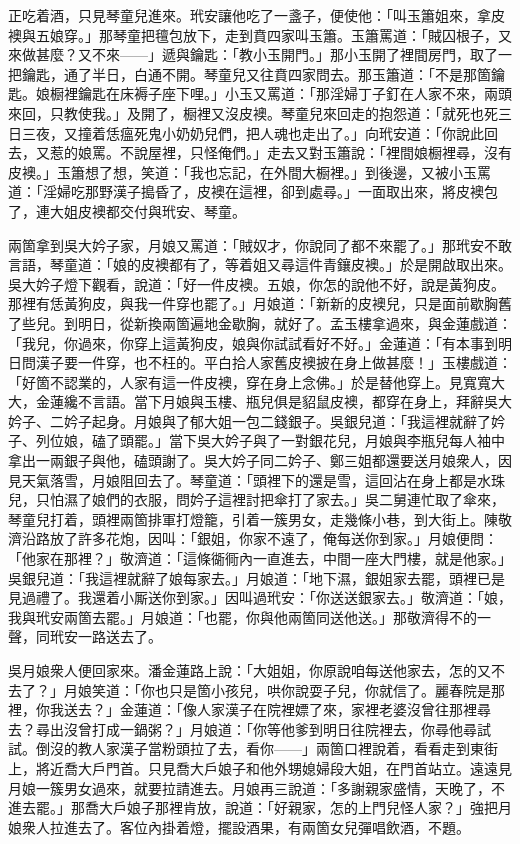 正吃着酒，只見琴童兒進來。玳安讓他吃了一盞子，便使他：「叫玉簫姐來，拿皮襖與五娘穿。」那琴童把氊包放下，走到賁四家叫玉簫。玉簫罵道：「賊囚根子，又來做甚麼？又不來——」遞與鑰匙：「教小玉開門。」那小玉開了裡間房門，取了一把鑰匙，通了半日，白通不開。琴童兒又往賁四家問去。那玉簫道：「不是那箇鑰匙。娘橱裡鑰匙在床褥子座下哩。」小玉又罵道：「那淫婦丁子釘在人家不來，兩頭來回，只教使我。」及開了，橱裡又沒皮襖。琴童兒來回走的抱怨道：「就死也死三日三夜，又撞着恁瘟死鬼小奶奶兒們，把人魂也走出了。」向玳安道：「你說此回去，又惹的娘罵。不說屋裡，只怪俺們。」走去又對玉簫說：「裡間娘橱裡尋，沒有皮襖。」玉簫想了想，笑道：「我也忘記，在外間大橱裡。」到後邊，又被小玉罵道：「淫婦吃那野漢子搗昏了，皮襖在這裡，卻到處尋。」一面取出來，將皮襖包了，連大姐皮襖都交付與玳安、琴童。

兩箇拿到吳大妗子家，月娘又罵道：「賊奴才，你說同了都不來罷了。」那玳安不敢言語，琴童道：「娘的皮襖都有了，等着姐又尋這件青鑲皮襖。」於是開啟取出來。吳大妗子燈下觀看，說道：「好一件皮襖。五娘，你怎的說他不好，說是黃狗皮。那裡有恁黃狗皮，與我一件穿也罷了。」月娘道：「新新的皮襖兒，只是面前歇胸舊了些兒。到明日，從新換兩箇遍地金歇胸，就好了。孟玉樓拿過來，與金蓮戲道：「我兒，你過來，你穿上這黃狗皮，娘與你試試看好不好。」金蓮道：「有本事到明日問漢子要一件穿，也不枉的。平白拾人家舊皮襖披在身上做甚麼！」玉樓戲道：「好箇不認業的，人家有這一件皮襖，穿在身上念佛。」於是替他穿上。見寬寬大大，金蓮纔不言語。當下月娘與玉樓、瓶兒俱是貂鼠皮襖，都穿在身上，拜辭吳大妗子、二妗子起身。月娘與了郁大姐一包二錢銀子。吳銀兒道：「我這裡就辭了妗子、列位娘，磕了頭罷。」當下吳大妗子與了一對銀花兒，月娘與李瓶兒每人袖中拿出一兩銀子與他，磕頭謝了。吳大妗子同二妗子、鄭三姐都還要送月娘衆人，因見天氣落雪，月娘阻回去了。琴童道：「頭裡下的還是雪，這回沾在身上都是水珠兒，只怕濕了娘們的衣服，問妗子這裡討把傘打了家去。」吳二舅連忙取了傘來，琴童兒打着，頭裡兩箇排軍打燈籠，引着一簇男女，走幾條小巷，到大街上。陳敬濟沿路放了許多花炮，因叫：「銀姐，你家不遠了，俺每送你到家。」月娘便問：「他家在那裡？」敬濟道：「這條衚衕內一直進去，中間一座大門樓，就是他家。」吳銀兒道：「我這裡就辭了娘每家去。」月娘道：「地下濕，銀姐家去罷，頭裡已是見過禮了。我還着小厮送你到家。」因叫過玳安：「你送送銀家去。」敬濟道：「娘，我與玳安兩箇去罷。」月娘道：「也罷，你與他兩箇同送他送。」那敬濟得不的一聲，同玳安一路送去了。

吳月娘衆人便回家來。潘金蓮路上說：「大姐姐，你原說咱每送他家去，怎的又不去了？」月娘笑道：「你也只是箇小孩兒，哄你說耍子兒，你就信了。麗春院是那裡，你我送去？」金蓮道：「像人家漢子在院裡嫖了來，家裡老婆沒曾往那裡尋去？尋出沒曾打成一鍋粥？」月娘道：「你等他爹到明日往院裡去，你尋他尋試試。倒沒的教人家漢子當粉頭拉了去，看你——」兩箇口裡說着，看看走到東街上，將近喬大戶門首。只見喬大戶娘子和他外甥媳婦段大姐，在門首站立。遠遠見月娘一簇男女過來，就要拉請進去。月娘再三說道：「多謝親家盛情，天晚了，不進去罷。」那喬大戶娘子那裡肯放，說道：「好親家，怎的上門兒怪人家？」強把月娘衆人拉進去了。客位內掛着燈，擺設酒果，有兩箇女兒彈唱飲酒，不題。

